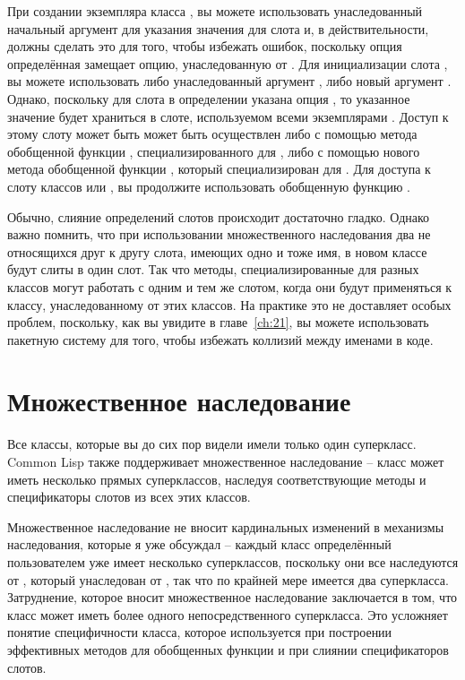 При создании экземпляра класса , вы можете использовать унаследованный начальный
аргумент  для указания значения для слота  и, в действительности, должны
сделать это для того, чтобы избежать ошибок, поскольку опция  определённая
 замещает опцию, унаследованную от . Для инициализации слота ,
вы можете использовать либо унаследованный аргумент , либо новый аргумент
.  Однако, поскольку для слота  в определении  указана
опция , то указанное значение будет храниться в слоте, используемом
всеми экземплярами . Доступ к этому слоту может быть может быть осуществлен либо
с помощью метода обобщенной функции , специализированного для , либо с
помощью нового метода обобщенной функции , который специализирован для
.  Для доступа к слоту  классов  или , вы продолжите
использовать обобщенную функцию .

Обычно, слияние определений слотов происходит достаточно гладко.  Однако важно помнить,
что при использовании множественного наследования два не относящихся друг к другу слота,
имеющих одно и тоже имя, в новом классе будут слиты в один слот.  Так что методы,
специализированные для разных классов могут работать с одним и тем же слотом, когда они
будут применяться к классу, унаследованному от этих классов.  На практике это не
доставляет особых проблем, поскольку, как вы увидите в главе~\ref{ch:21}, вы можете
использовать пакетную систему для того, чтобы избежать коллизий между именами в коде.

\section{Множественное наследование}
\label{sec:17-multi-inheritance}

Все классы, которые вы до сих пор видели имели только один суперкласс. Common Lisp также
поддерживает множественное наследование -- класс может иметь несколько прямых
суперклассов, наследуя соответствующие методы и спецификаторы слотов из всех этих классов.

Множественное наследование не вносит кардинальных изменений в механизмы наследования,
которые я уже обсуждал -- каждый класс определённый пользователем уже имеет несколько
суперклассов, поскольку они все наследуются от , который унаследован
от , так что по крайней мере имеется два суперкласса.  Затруднение, которое вносит
множественное наследование заключается в том, что класс может иметь более одного
непосредственного суперкласса.  Это усложняет понятие специфичности класса, которое
используется при построении эффективных методов для обобщенных функции и при слиянии
спецификаторов слотов.


